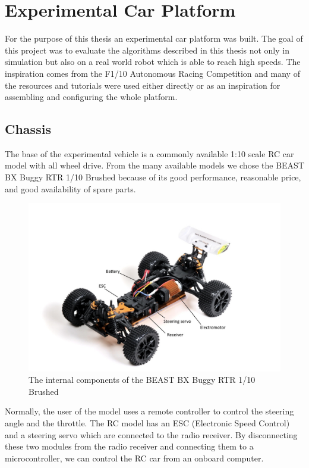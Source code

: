 \chapter{Experimental Car Platform}

For the purpose of this thesis an experimental car platform was built.
The goal of this project was to evaluate the algorithms described in this thesis not only in simulation but also on a real world robot which is able to reach high speeds. The inspiration comes from the F1/10 Autonomous Racing Competition \cite{f1tenth} and many of the resources and tutorials were used either directly or as an inspiration for assembling and configuring the whole platform.

\section{Chassis}

The base of the experimental vehicle is a commonly available 1:10 scale RC car model with all wheel drive. From the many available models we chose the BEAST BX Buggy RTR 1/10 Brushed \cite{beast} because of its good performance, reasonable price, and good availability of spare parts.

\begin{figure}
    \includegraphics[width=\textwidth]{../img/beast-without-cover.jpg}
    \centering
    \caption{The internal components of the BEAST BX Buggy RTR 1/10 Brushed}
\end{figure}

Normally, the user of the model uses a remote controller to control the steering angle and the throttle. The RC model has an ESC (Electronic Speed Control) and a steering servo which are connected to the radio receiver. By disconnecting these two modules from the radio receiver and connecting them to a microcontroller, we can control the RC car from an onboard computer.

